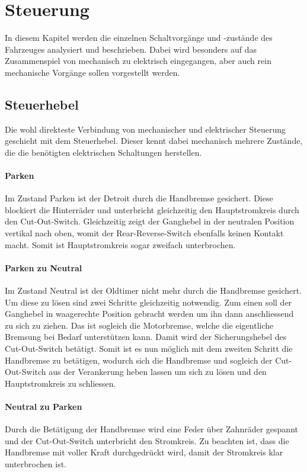 \section{Steuerung}
In diesem Kapitel werden die einzelnen Schaltvorgänge und -zustände des Fahrzeuges analysiert und beschrieben. Dabei wird besonders auf das Zusammenspiel von mechanisch zu elektrisch eingegangen, aber auch rein mechanische Vorgänge sollen vorgestellt werden.

\subsection{Steuerhebel}
Die wohl direkteste Verbindung von mechanischer und elektrischer Steuerung geschieht mit dem Steuerhebel. Dieser kennt dabei mechanisch mehrere Zustände, die die benötigten elektrischen Schaltungen herstellen.

\paragraph{Parken}
Im Zustand Parken ist der Detroit durch die Handbremse gesichert. Diese blockiert die Hinterräder und unterbricht gleichzeitig den Hauptstromkreis durch den Cut-Out-Switch. Gleichzeitig zeigt der Ganghebel in der neutralen Position vertikal nach oben, womit der Rear-Reverse-Switch ebenfalls keinen Kontakt macht. Somit ist Hauptstromkreis sogar zweifach unterbrochen.

\paragraph{Parken zu Neutral}
Im Zustand Neutral ist der Oldtimer nicht mehr durch die Handbremse gesichert. Um diese zu lösen sind zwei Schritte gleichzeitig notwendig. Zum einen soll der Ganghebel in waagerechte Position gebracht werden um ihn dann anschliessend zu sich zu ziehen. Das ist sogleich die Motorbremse, welche die eigentliche Bremsung bei Bedarf unterstützen kann. Damit wird der Sicherungshebel des Cut-Out-Switch betätigt. Somit ist es nun möglich mit dem zweiten Schritt die Handbremse zu betätigen, wodurch sich die Handbremse und sogleich der Cut-Out-Switch aus der Verankerung heben lassen um sich zu lösen und den Hauptstromkreis zu schliessen.

\paragraph{Neutral zu Parken}
Durch die Betätigung der Handbremse wird eine Feder über Zahnräder gespannt und der Cut-Out-Switch unterbricht den Stromkreis. Zu beachten ist, dass die Handbremse mit voller Kraft durchgedrückt wird, damit der Stromkreis klar unterbrochen ist.

